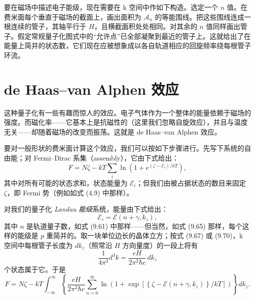 要在磁场中描述电子能级，现在需要在 k 空间中作如下构造。选定一个 $n$ 值。在费米面每个垂直于磁场的截面上，画出面积为 $\mathcal{A}_{n}$ 的等能围线。把这些围线连成一根连续的管子，其轴平行于 $H$，且横截面积处处相同。对其余的 $n$ 值同样画出管子。假定常规量子化图式中的“允许点”已全部凝聚到最近的管子上。这就给出了在能量上简并的状态数，它们现在应被想象成以各自轨道相应的回旋频率绕每根管子环流。


\section{de Haas--van Alphen 效应}

这种量子化有一些有趣而惊人的效应。电子气体作为一个整体的能量依赖于磁场的强度。而磁化率——它基本上是抗磁性的（这里我们忽略自旋效应），并且与温度无关——却随着磁场的改变而振荡。这就是 de Haas--van Alphen 效应。

要对一般形状的费米面计算这个效应，我们可以按如下步骤进行。先写下系统的自由能；对 Fermi--Dirac 系集（assembly），它由下式给出：
\begin{equation*}
F=N\zeta-kT\sum_{i}\ln\left(1+e^{(\zeta-\mathcal{E}_{i})/kT}\right),
\tag{9.71}
\end{equation*}
其中对所有可能的状态求和，状态能量为 $\mathcal{E}_{i}$；但我们由被占据状态的数目来固定 $\zeta$，即 Fermi 势（例如如式 (4.9) 中那样）。

对我们的量子化 \emph{Landau 能级}系统，能量由下式给出：
\begin{equation*}
\mathcal{E}_{i}=\mathcal{E}(n+\gamma,k_{z}),
\tag{9.72}
\end{equation*}
其中 $n$ 是轨道量子数，如式 (9.61) 中那样——但当然，如式 (9.65) 那样，每个这样的能级是 $p$ 重简并的。取一块单位边长的晶体立方；按式 (9.67) 或 (9.70)，k 空间中每根管子长度为 $dk_{z}$（照常沿 $H$ 方向量度）的一段上将有
\begin{equation*}
\frac{1}{4\pi^{3}}d^{3}k=\frac{eH}{2\pi^{2}\hbar c}\,dk_{z}
\tag{9.73}
\end{equation*}
个状态属于它。于是
\begin{equation*}
F=N\zeta-kT\int_{-\infty}^{\infty}\left\{\frac{eH}{2\pi^{2}\hbar c}\sum_{n=0}^{\infty}\ln\left(1+\exp\left[\left\{\zeta-\mathcal{E}(n+\gamma,k_{z})\right\}/kT\right]\right)\right\}dk_{z}.
\tag{9.74}
\end{equation*}

